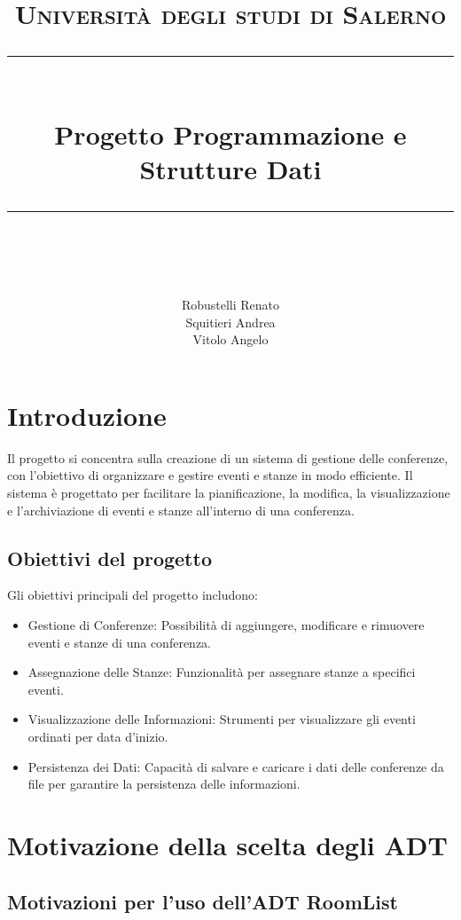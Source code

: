 \documentclass[11pt]{scrartcl} %
\title{
	\normalfont\normalsize
	\textsc{Università degli studi di Salerno}\\ %
	\vspace{25pt} %
	\rule{\linewidth}{0.5pt}\\ %
	\vspace{20pt} %
	{\huge Progetto Programmazione e Strutture Dati}\\ %
	\vspace{12pt} %
	\rule{\linewidth}{2pt}\\ %
	\vspace{12pt} %
}
\author{
	\LARGE
	Robustelli Renato \\
	\LARGE
	Squitieri Andrea \\
	\LARGE
	Vitolo Angelo
} %
\date{\null}
\begin{document}
\maketitle %

\tableofcontents

\section{Introduzione}




Il progetto si concentra sulla creazione di un sistema di gestione delle conferenze, con l'obiettivo di organizzare e gestire eventi e stanze in modo efficiente. Il sistema è progettato per facilitare la pianificazione, la modifica, la visualizzazione e l'archiviazione di eventi e stanze all'interno di una conferenza.



\subsection{Obiettivi del progetto}
Gli obiettivi principali del progetto includono:

\begin{itemize}
	\item  Gestione di Conferenze: Possibilità di aggiungere, modificare e rimuovere eventi e stanze di una conferenza.
	\item Assegnazione delle Stanze: Funzionalità per assegnare stanze a specifici eventi.
	\item Visualizzazione delle Informazioni: Strumenti per visualizzare gli eventi ordinati per data d'inizio.
	\item Persistenza dei Dati: Capacità di salvare e caricare i dati delle conferenze da file per garantire la persistenza delle informazioni.
\end{itemize}


\section{Motivazione della scelta degli ADT}
\subsection{Motivazioni per l'uso dell'ADT RoomList}
\end{document}
